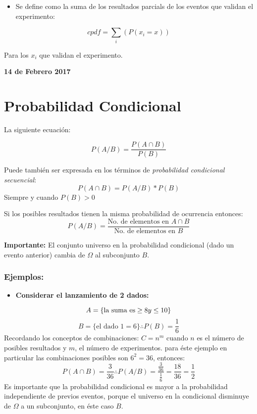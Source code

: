 \documentclass[]{book}
\providecommand{\tightlist}{%
  \setlength{\itemsep}{0pt}\setlength{\parskip}{0pt}}
\begin{document}
\begin{itemize}
\tightlist
\item
  Se define como la suma de los resultados parcials de los eventos que
  validan el experimento:
\end{itemize}

\[cpdf = \sum_{i}(P(x_i=x))\]

Para los \(x_i\) que validan el experimento.

\textbf{14 de Febrero 2017}

\section{Probabilidad Condicional}\label{probabilidad-condicional}

La siguiente ecuación:

\[P(A/B) = \frac{P(A\cap B)}{P(B)}\]

Puede también ser expresada en los términos de \emph{probabilidad
condicional secuencial}: \[P(A\cap B) = P(A/B)*P(B)\] Siempre y cuando
\(P(B)>0\)

Si los posibles resultados tienen la misma probabilidad de ocurrencia
entonces:
\[P(A/B) = \frac{\text{No. de elementos en } A\cap B}{\text{No. de elementos en }B}\]

\textbf{Importante:} El conjunto universo en la probabilidad condicional
(dado un evento anterior) cambia de \(\Omega\) al subconjunto \(B\).

\subsubsection{Ejemplos:}\label{ejemplos}

\begin{itemize}
\tightlist
\item
  \textbf{Considerar el lanzamiento de 2 dados:}
\end{itemize}

\[A = \{\text{la suma es}\geq 8 \space y \space \leq 10\}\]
\[B = \{\text{el dado 1}=6 \} \therefore P(B) = \frac {1}{6}\]
Recordando los conceptos de combinaciones: \(C = n^m\) cuando \(n\) es
el número de posibles resultados y \(m\), el número de experimentos.
para éste ejemplo en particular las combinaciones posibles son
\(6^2 = 36\), entonces:
\[P(A\cap B) = \frac {3}{36} \therefore P(A/B) = \frac {\frac {3}{36}}{\frac {1}{6}} = \frac {18}{36} = \frac {1}{2}\]
Es importante que la probabilidad condicional es mayor a la probabilidad
independiente de previos eventos, porque el universo en la condicional
disminuye de \(\Omega\) a un subconjunto, en éste caso \(B\).
\end{document}
